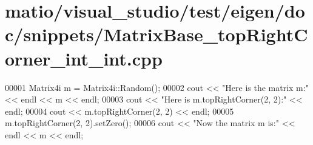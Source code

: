 \hypertarget{matio_2visual__studio_2test_2eigen_2doc_2snippets_2_matrix_base__top_right_corner__int__int_8cpp_source}{}\section{matio/visual\+\_\+studio/test/eigen/doc/snippets/\+Matrix\+Base\+\_\+top\+Right\+Corner\+\_\+int\+\_\+int.cpp}
\label{matio_2visual__studio_2test_2eigen_2doc_2snippets_2_matrix_base__top_right_corner__int__int_8cpp_source}

\begin{DoxyCode}
00001 Matrix4i m = Matrix4i::Random();
00002 cout << \textcolor{stringliteral}{"Here is the matrix m:"} << endl << m << endl;
00003 cout << \textcolor{stringliteral}{"Here is m.topRightCorner(2, 2):"} << endl;
00004 cout << m.topRightCorner(2, 2) << endl;
00005 m.topRightCorner(2, 2).setZero();
00006 cout << \textcolor{stringliteral}{"Now the matrix m is:"} << endl << m << endl;
\end{DoxyCode}
